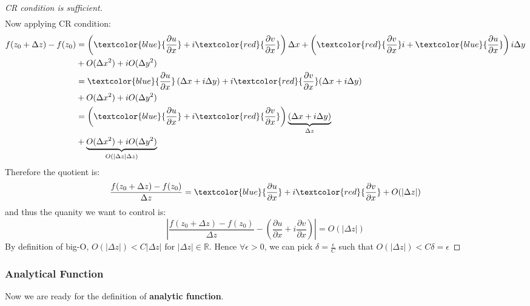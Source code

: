\begin{proof}[CR condition is sufficient]
\begin{equation}
\begin{aligned}
\end{aligned}
\end{equation}
Now applying CR condition:
\begin{equation}
\begin{aligned}
f(z_0+\Delta z)-f(z_0) &=  \left(\textcolor{blue}{\frac{\partial u}{\partial x}}+i\textcolor{red}{\frac{\partial v}{\partial x}}\right)\Delta x+\left(\textcolor{red}{\frac{\partial v}{\partial x}}i + \textcolor{blue}{\frac{\partial u}{\partial x}}\right)i\Delta y\\ &+ O(\Delta x^2)+iO(\Delta y^2)  \\
&= \textcolor{blue}{\frac{\partial u}{\partial x}}\left(\Delta x + i\Delta y\right) + i\textcolor{red}{\frac{\partial v}{\partial x}}(\Delta x+i\Delta y)
\\ &+ O(\Delta x^2)+iO(\Delta y^2) \\
&= \left(\textcolor{blue}{\frac{\partial u}{\partial x}} + i\textcolor{red}{\frac{\partial v}{\partial x}}\right)\underbrace{(\Delta x +i\Delta y)}_{\Delta z}\\
&+ \underbrace{O(\Delta x^2)+iO(\Delta y^2)}_{O(|\Delta z|\Delta z)} \\
\end{aligned}
\end{equation}
Therefore the quotient is:
\begin{equation}
\frac{f(z_0+\Delta z)-f(z_0)}{\Delta z} =\textcolor{blue}{\frac{\partial u}{\partial x}} + i\textcolor{red}{\frac{\partial v}{\partial x} }+O(|\Delta z|)
\end{equation}
and thus the quanity we want to control is:
\begin{equation}
\left| \frac{f(z_0+\Delta z)-f(z_0)}{\Delta z} - \left(\frac{\partial u}{\partial x} + i\frac{\partial v}{\partial x}\right) \right|=O(|\Delta z|)
\end{equation}
By definition of big-O, $O(|\Delta z|)<C|\Delta z|$ for $|\Delta z|\in \mathbb{R}$. Hence $\forall \epsilon >0$, we can pick $\delta =\frac{\epsilon}{C}$ such that $O(|\Delta z|)<C\delta =\epsilon$

\end{proof}\subsubsection{Analytical Function}

Now we are ready for the definition of \textbf{analytic function}.

